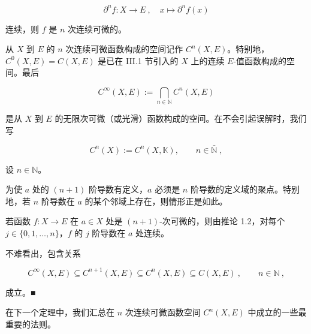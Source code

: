 \[
\partial^{n}f\colon X\to E~,\quad x\mapsto\partial^{n}f(x)
\]

连续，则 $f$ 是 $n$ 次连续可微的。

从 $X$ 到 $E$ 的 $n$ 次连续可微函数构成的空间记作 $C^n(X,E)$。特别地，$C^0(X,E) = C(X,E)$ 是已在 III.1 节引入的 $X$ 上的连续 $E$-值函数构成的空间。最后

\[
C^{\infty}(X,E):=\bigcap_{n\in\mathbb{N}}C^{n}(X,E)
\]

是从 $X$ 到 $E$ 的无限次可微（或光滑）函数构成的空间。在不会引起误解时，我们写

\[
C^{n}(X):=C^{n}(X,\mathbb{K}),\qquad n\in\bar{\mathbb{N}}\;,
\]

\begin{remark}

设 $ n \in \mathbb{N} $。

\begin{items}
\item

为使 $a$ 处的 $ (n+1) $ 阶导数有定义，$a$ 必须是 $ n $ 阶导数的定义域的聚点。特别地，若 $ n $ 阶导数在 $a$ 的某个邻域上存在，则情形正是如此。

\item

若函数 $ f: X \to E $ 在 $ a \in X $ 处是 $ (n+1) $-次可微的，则由推论 1.2，对每个 $ j \in \{0,1,\ldots,n\} $，$ f $ 的 $ j $ 阶导数在 $ a $ 处连续。

\item

不难看出，包含关系

\[
C^{\infty}(X,E)\subseteq C^{n+1}(X,E)\subseteq C^{n}(X,E)\subseteq C(X,E)~,\qquad n\in\mathbb{N}~,
\]

成立。■

\end{items}

在下一个定理中，我们汇总在 $n$ 次连续可微函数空间 $ C^{n}(X,E) $ 中成立的一些最重要的法则。

\end{remark}

